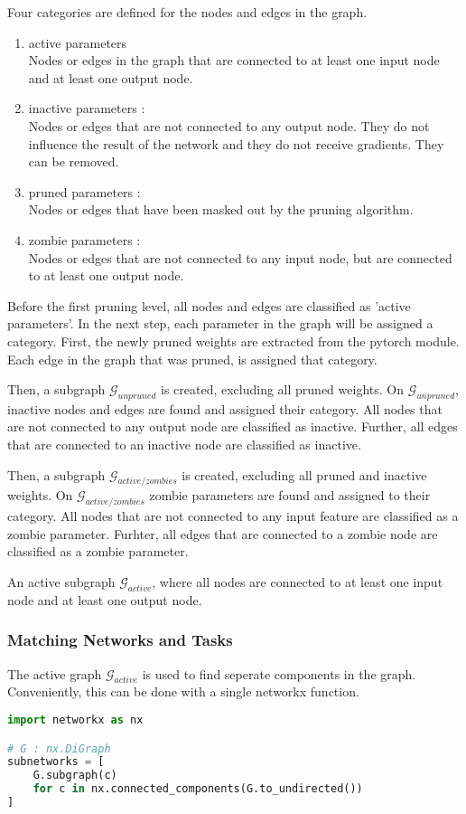 Four categories are defined for the nodes and edges in the graph.
\begin{enumerate}
    \item active parameters  \\
    Nodes or edges in the graph that are connected to at least one input node and at least one output node.
    \item inactive parameters : \\
    Nodes or edges that are not connected to any output node. They do not influence the result of the network and they do not receive gradients. They can be removed.
    \item pruned parameters : \\
    Nodes or edges that have been masked out by the pruning algorithm.
    \item zombie parameters : \\
    Nodes or edges that are not connected to any input node, but are connected to at least one output node.
\end{enumerate}
Before the first pruning level, all nodes and edges are classified as 'active parameters'.
In the next step, each parameter in the graph will be assigned a category.
First, the newly pruned weights are extracted from the pytorch module.
Each edge in the graph that was pruned, is assigned that category.

Then, a subgraph $\mathcal{G}_{unpruned}$ is created, excluding all pruned weights.
On $\mathcal{G}_{unpruned}$, inactive nodes and edges are found and assigned their category.
All nodes that are not connected to any output node are classified as inactive.
Further, all edges that are connected to an inactive node are classified as inactive.

Then, a subgraph $\mathcal{G}_{active/zombies}$ is created, excluding all pruned and inactive weights.
On $\mathcal{G}_{active/zombies}$ zombie parameters are found and assigned to their category. 
All nodes that are not connected to any input feature are classified as a zombie parameter. 
Furhter, all edges that are connected to a zombie node are classified as a zombie parameter.

An active subgraph $\mathcal{G}_{active}$, where all nodes are connected to at least one input node and at least one output node.

\subsubsection{Matching Networks and Tasks}
The active graph $\mathcal{G}_{active}$ is used to find seperate components in the graph.
Conveniently, this can be done with a single networkx function.
\begin{lstlisting}[language=Python]
import networkx as nx

# G : nx.DiGraph
subnetworks = [
    G.subgraph(c) 
    for c in nx.connected_components(G.to_undirected())
]
\end{lstlisting}

